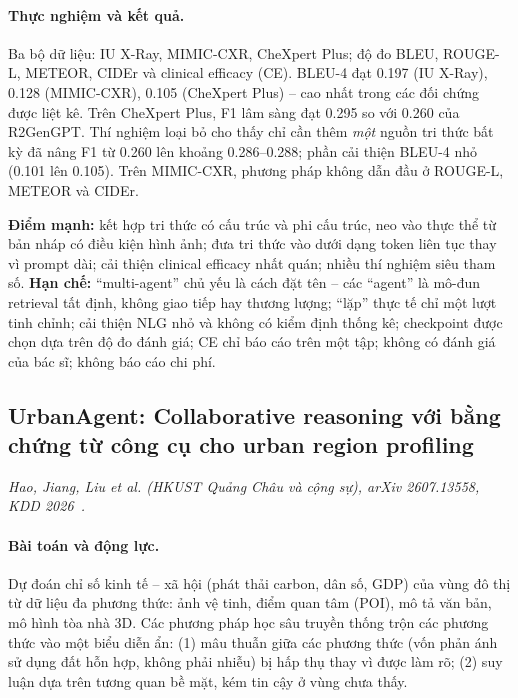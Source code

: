 \paragraph{Thực nghiệm và kết quả.} Ba bộ dữ liệu: IU X-Ray, MIMIC-CXR, CheXpert Plus; độ đo BLEU, ROUGE-L, METEOR, CIDEr và clinical efficacy (CE). BLEU-4 đạt 0.197 (IU X-Ray), 0.128 (MIMIC-CXR), 0.105 (CheXpert Plus) -- cao nhất trong các đối chứng được liệt kê. Trên CheXpert Plus, F1 lâm sàng đạt 0.295 so với 0.260 của R2GenGPT. Thí nghiệm loại bỏ cho thấy chỉ cần thêm \emph{một} nguồn tri thức bất kỳ đã nâng F1 từ 0.260 lên khoảng 0.286--0.288; phần cải thiện BLEU-4 nhỏ (0.101 lên 0.105). Trên MIMIC-CXR, phương pháp không dẫn đầu ở ROUGE-L, METEOR và CIDEr.

\begin{nhanxet}
\textbf{Điểm mạnh:} kết hợp tri thức có cấu trúc và phi cấu trúc, neo vào thực thể từ bản nháp có điều kiện hình ảnh; đưa tri thức vào dưới dạng token liên tục thay vì prompt dài; cải thiện clinical efficacy nhất quán; nhiều thí nghiệm siêu tham số. \textbf{Hạn chế:} ``multi-agent'' chủ yếu là cách đặt tên -- các ``agent'' là mô-đun retrieval tất định, không giao tiếp hay thương lượng; ``lặp'' thực tế chỉ một lượt tinh chỉnh; cải thiện NLG nhỏ và không có kiểm định thống kê; checkpoint được chọn dựa trên độ đo đánh giá; CE chỉ báo cáo trên một tập; không có đánh giá của bác sĩ; không báo cáo chi phí.
\end{nhanxet}

\subsection{UrbanAgent: Collaborative reasoning với bằng chứng từ công cụ cho urban region profiling}
\label{sec:urban}

\noindent\textit{Hao, Jiang, Liu et al. (HKUST Quảng Châu và cộng sự), arXiv 2607.13558, KDD 2026~\cite{p6urban}.}

\paragraph{Bài toán và động lực.} Dự đoán chỉ số kinh tế -- xã hội (phát thải carbon, dân số, GDP) của vùng đô thị từ dữ liệu đa phương thức: ảnh vệ tinh, điểm quan tâm (POI), mô tả văn bản, mô hình tòa nhà 3D. Các phương pháp học sâu truyền thống trộn các phương thức vào một biểu diễn ẩn: (1) mâu thuẫn giữa các phương thức (vốn phản ánh sử dụng đất hỗn hợp, không phải nhiễu) bị hấp thụ thay vì được làm rõ; (2) suy luận dựa trên tương quan bề mặt, kém tin cậy ở vùng chưa thấy.

